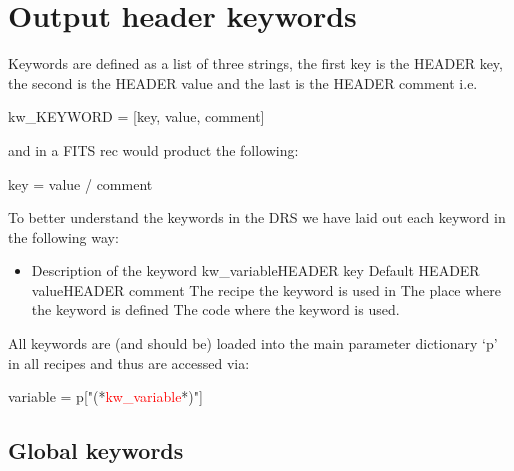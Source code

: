 \chapter{Output header keywords}
\label{ch:output_keywords}


Keywords are defined as a list of three strings, the first key is the HEADER key, the second is the HEADER value and the last is the HEADER comment i.e.
\begin{pythonbox}
kw_KEYWORD = [key, value, comment]
\end{pythonbox}
\noindent and in a FITS rec would product the following:
\begin{cmdboxprint}
key     = value              / comment
\end{cmdboxprint}

\vspace{1cm}
\noindent To better understand the keywords in the DRS we have laid out each keyword in the following way:
\begin{itemize}
\item {}
{Description of the keyword}
{kw\_variable}{HEADER key}
{Default HEADER value}{HEADER comment}
{The recipe the keyword is used in}
{The place where the keyword is defined}
{The code where the keyword is used.}
\end{itemize}

\begin{note}
All keywords are (and should be) loaded into the main parameter dictionary `p' in all recipes and thus are accessed via: 
\begin{pythonbox}
variable = p["(*\textcolor{red}{kw\_variable}*)"]
\end{pythonbox}
\end{note}





\clearpage
\newpage
\section{Global keywords}
\label{ch:output_keywords:global}

